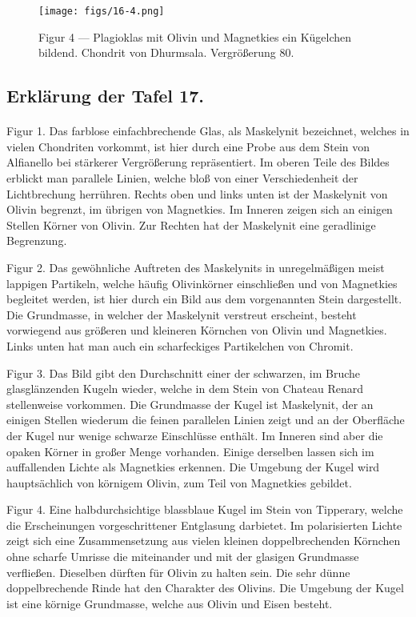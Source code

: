 \documentclass[a4paper, 12pt, oneside]{article}
\begin{document}
\vspace*{\fill}
\begin{figure}[H]
\centering
\texttt{[image: figs/16-4.png]}
\caption{\small Figur 4 --- Plagioklas mit Olivin und Magnetkies ein Kügelchen bildend. Chondrit von Dhurmsala. Vergrößerung 80.}
\end{figure}
\vspace*{\fill} 
\clearpage

\subsection{Erklärung der Tafel 17.}
\paragraph{}
Figur 1. Das farblose einfachbrechende Glas, als Maskelynit bezeichnet, welches in vielen Chondriten vorkommt, ist hier durch eine Probe aus dem Stein von Alfianello bei stärkerer Vergrößerung repräsentiert. Im oberen Teile des Bildes erblickt man parallele Linien, welche bloß von einer Verschiedenheit der Lichtbrechung herrühren. Rechts oben und links unten ist der Maskelynit von Olivin begrenzt, im übrigen von Magnetkies. Im Inneren zeigen sich an einigen Stellen Körner von Olivin. Zur Rechten hat der Maskelynit eine geradlinige Begrenzung.

Figur 2. Das gewöhnliche Auftreten des Maskelynits in unregelmäßigen meist lappigen Partikeln, welche häufig Olivinkörner einschließen und von Magnetkies begleitet werden, ist hier durch ein Bild aus dem vorgenannten Stein dargestellt. Die Grundmasse, in welcher der Maskelynit verstreut erscheint, besteht vorwiegend aus größeren und kleineren Körnchen von Olivin und Magnetkies. Links unten hat man auch ein scharfeckiges Partikelchen von Chromit.

Figur 3. Das Bild gibt den Durchschnitt einer der schwarzen, im Bruche glasglänzenden Kugeln wieder, welche in dem Stein von Chateau Renard stellenweise vorkommen. Die Grundmasse der Kugel ist Maskelynit, der an einigen Stellen wiederum die feinen parallelen Linien zeigt und an der Oberfläche der Kugel nur wenige schwarze Einschlüsse enthält. Im Inneren sind aber die opaken Körner in großer Menge vorhanden. Einige derselben lassen sich im auffallenden Lichte als Magnetkies erkennen. Die Umgebung der Kugel wird hauptsächlich von körnigem Olivin, zum Teil von Magnetkies gebildet.

Figur 4. Eine halbdurchsichtige blassblaue Kugel im Stein von Tipperary, welche die Erscheinungen vorgeschrittener Entglasung darbietet. Im polarisierten Lichte zeigt sich eine Zusammensetzung aus vielen kleinen doppelbrechenden Körnchen ohne scharfe Umrisse die miteinander und mit der glasigen Grundmasse verfließen. Dieselben dürften für Olivin zu halten sein. Die sehr dünne doppelbrechende Rinde hat den Charakter des Olivins. Die Umgebung der Kugel ist eine körnige Grundmasse, welche aus Olivin und Eisen besteht.
\clearpage
\end{document}
